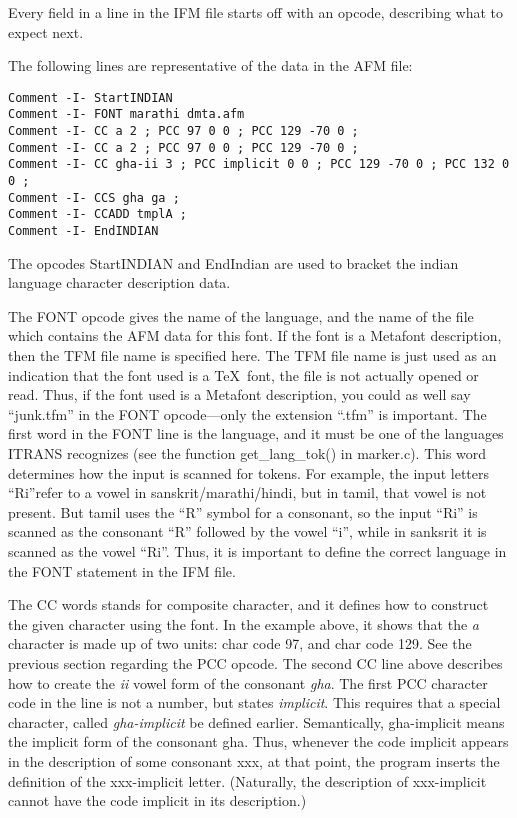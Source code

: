 \documentclass[11pt]{article}
\begin{document}
Every field in a line in the IFM file starts off with an opcode,
describing what to expect next.

The following lines are representative of the data in the AFM file:

\begin{verbatim}
Comment -I- StartINDIAN
Comment -I- FONT marathi dmta.afm
Comment -I- CC a 2 ; PCC 97 0 0 ; PCC 129 -70 0 ;
Comment -I- CC a 2 ; PCC 97 0 0 ; PCC 129 -70 0 ;
Comment -I- CC gha-ii 3 ; PCC implicit 0 0 ; PCC 129 -70 0 ; PCC 132 0 0 ;
Comment -I- CCS gha ga ;
Comment -I- CCADD tmplA ;
Comment -I- EndINDIAN
\end{verbatim}


The opcodes StartINDIAN and EndIndian are used to bracket the indian
language character description data.

The FONT opcode gives the name of the language, and the name of the file
which contains the AFM data for this font.
If the font is a Metafont description, then the TFM file name is
specified here.
The TFM file name is just used as an indication that the font used is a
\TeX\ font, the file is not actually opened or read.
Thus, if the font used is a Metafont description, you could as well say
``junk.tfm'' in the FONT opcode---only the extension ``.tfm'' is
important.
The first word in the FONT line is the language, and it must be one of the
languages ITRANS recognizes (see the function get\_lang\_tok() in marker.c).
This word determines how the input is scanned for tokens.
For example, the input letters ``Ri''refer to a vowel in
sanskrit/marathi/hindi, but in tamil, that vowel is not present.
But tamil uses the ``R'' symbol for a consonant, so the input ``Ri''
is scanned as the consonant ``R'' followed by the vowel ``i'', while in
sanksrit it is scanned as the vowel ``Ri''.
Thus, it is important to define the correct language in the FONT statement
in the IFM file.

The CC words stands for composite character, and it defines how to
construct the given character using the font.
In the example above, it shows that the {\em a} character is made up of
two units: char code 97, and char code 129.
See the previous section regarding the PCC opcode.
The second CC line above describes how to create the {\em ii} vowel form
of the consonant {\em gha}.
The first PCC character code in the line is not a number, but states {\em
implicit}.
This requires that a special character, called {\em gha-implicit} be
defined earlier.
Semantically, gha-implicit means the implicit form of the consonant gha.
Thus, whenever the code implicit appears in the description of some
consonant xxx, at that point, the program inserts the definition of the
xxx-implicit letter.
(Naturally, the description of xxx-implicit cannot have the code implicit 
in its description.)
\end{document}
